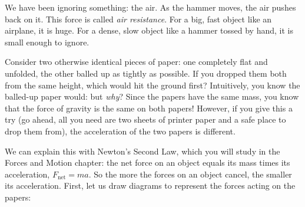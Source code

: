 We have been ignoring something: the air. As the hammer moves, the air pushes back on it. This force is called \emph{air resistance}. For a big, fast object like an airplane, it is huge. For a dense, slow object like a hammer tossed by hand, it is small enough to ignore.

Consider two otherwise identical pieces of paper: one completely flat and 
unfolded, the other balled up as tightly as possible. If you dropped them both 
from the same height, which would hit the ground first? Intuitively, you know 
the balled-up paper would: but \textit{why}? Since the papers have the same 
mass, you know that the force of gravity is the same on both papers! However, 
if you give this a try (go ahead, all you need are two sheets of printer paper 
and a safe place to drop them from), the acceleration of the two papers is 
different. 

We can explain this with Newton's Second Law, which you will study in the
Forces and Motion chapter: the net force on an object equals its mass times its acceleration,
$F_{\text{net}} = ma$. So the more the forces on an object cancel, the smaller its acceleration. First,
let us draw diagrams to represent the forces acting on the papers:

